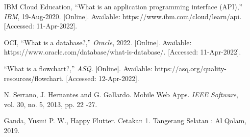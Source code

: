 \begin{thebibliography}{7}
IBM Cloud Education, “What is an application programming interface (API),” \emph{IBM}, 19-Aug-2020. [Online]. Available: https://www.ibm.com/cloud/learn/api. [Accessed: 11-Apr-2022]. 

OCI, “What is a database?,” \emph{Oracle}, 2022. [Online]. Available: https://www.oracle.com/database/what-is-database/. [Accessed: 11-Apr-2022]. 

“What is a flowchart?,” \emph{ASQ}. [Online]. Available: https://asq.org/quality-resources/flowchart. [Accessed: 12-Apr-2022]. 

N. Serrano, J. Hernantes and G. Gallardo. Mobile Web Apps. \emph{IEEE Software}, vol. 30, no. 5, 2013, pp. 22 -27.

Ganda, Yusmi P. W., Happy Flutter. Cetakan 1. Tangerang Selatan : Al Qolam, 2019.

\end{thebibliography}

